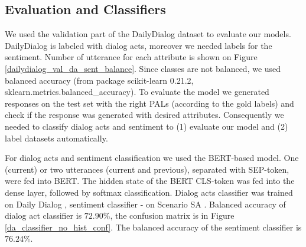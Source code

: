 \documentclass[11pt]{article}
\begin{document}





\subsection{Evaluation and Classifiers}
\label{sec:eval_cls}
We used the validation part of the DailyDialog \cite{li2017dailydialog} dataset to evaluate our models. DailyDialog is labeled with dialog acts, moreover we needed labels for the sentiment. Number of utterance for each attribute is shown on Figure \ref{dailydialog_val_da_sent_balance}. Since classes are not balanced, we used balanced accuracy (from package scikit-learn 0.21.2, sklearn.metrics.balanced\_accuracy). To evaluate the model we generated responses on the test set with the right PALs (according to the gold labels) and check if the response was generated with desired attributes. Consequently we needed to classify dialog acts and sentiment to (1) evaluate our model and (2) label datasets automatically.

For dialog acts and sentiment classification we used the BERT-based model. One (current) or two utterances (current and previous), separated with SEP-token, were fed into BERT. The hidden state of the BERT CLS-token was fed into the dense layer, followed by softmax classification. Dialog acts classifier was trained on Daily Dialog \cite{li2017dailydialog}, sentiment classifier - on Scenario SA \cite{9091843scenario}. Balanced accuracy of dialog act classifier is $72.90\%$, the confusion matrix is in Figure \ref{da_classifier_no_hist_conf}. The balanced accuracy of the sentiment classifier is $76.24\%$.

\end{document}
